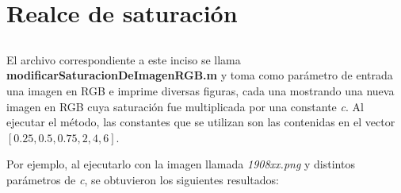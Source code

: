\documentclass{article}
\begin{document}
\section{Realce de saturación}

\subsection{}

El archivo correspondiente a este inciso se llama \textbf{modificarSaturacionDeImagenRGB.m} y toma como parámetro de entrada una imagen en RGB e imprime diversas figuras, cada una mostrando una nueva imagen en RGB cuya saturación fue multiplicada por una constante \textit{c}. Al ejecutar el método, las constantes que se utilizan son las contenidas en el vector $[0.25, 0.5, 0.75, 2, 4, 6]$.

Por ejemplo, al ejecutarlo con la imagen llamada \textit{1908xx.png} y distintos parámetros de \textit{c}, se obtuvieron los siguientes resultados:
\end{document}
